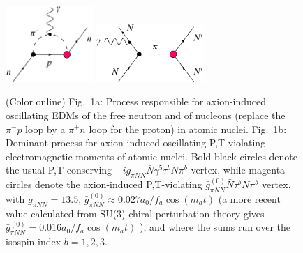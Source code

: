 \begin{figure}[h!]
  \begin{center}
  \includegraphics[width=3.3cm]{gfx/axions/nEDM_soft_pion_limit_NEW.png}
  \includegraphics[width=4.1cm]{gfx/axions/Pion_nucleon_PT-odd_NEW.png}
  \caption{(Color online) Fig.~1a: Process responsible for axion-induced oscillating EDMs of the free neutron and of nucleons (replace the $\pi^{-} p$ loop by a $\pi^{+} n$ loop for the proton) in atomic nuclei.
  Fig.~1b: Dominant process for axion-induced oscillating P,T-violating electromagnetic moments of atomic nuclei.
  Bold black circles denote the usual P,T-conserving $- i g_{\pi N N}  \bar{N}  \gamma^5 \tau^b N \pi^b$ vertex, while magenta circles denote the axion-induced P,T-violating $\bar{g}_{\pi N N}^{(0)} \bar{N} \tau^b N \pi^b$ vertex, with $g_{\pi NN} = 13.5$, $\bar{g}_{\pi N N}^{(0)} \approx 0.027 a_0/f_a \cos(m_a t)$ \cite{Witten1979} (a more recent value calculated from SU(3) chiral perturbation theory gives $\bar{g}_{\pi N N}^{(0)} =0.016 a_0/f_a \cos(m_a t)$ \cite{Mereghetti2015}), and where the sums run over the isospin index $b=1,2,3$.  }
  \end{center}
\end{figure}


